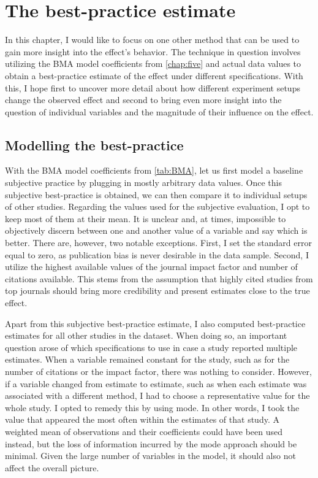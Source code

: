 \chapter{The best-practice estimate}
\label{chap:six}

In this chapter, I would like to focus on one other method that can be used to gain more insight into the effect's behavior. The technique in question involves utilizing the \ac{BMA} model coefficients from \autoref{chap:five} and actual data values to obtain a best-practice estimate of the effect under different specifications. With this, I hope first to uncover more detail about how different experiment setups change the observed effect and second to bring even more insight into the question of individual variables and the magnitude of their influence on the effect.


\section{Modelling the best-practice}
\label{sec:best_practice_base}

With the \ac{BMA} model coefficients from \autoref{tab:BMA}, let us first model a baseline subjective practice by plugging in mostly arbitrary data values. Once this subjective best-practice is obtained, we can then compare it to individual setups of other studies. Regarding the values used for the subjective evaluation, I opt to keep most of them at their mean. It is unclear and, at times, impossible to objectively discern between one and another value of a variable and say which is better. There are, however, two notable exceptions. First, I set the standard error equal to zero, as publication bias is never desirable in the data sample. Second, I utilize the highest available values of the journal impact factor and number of citations available. This stems from the assumption that highly cited studies from top journals should bring more credibility and present estimates close to the true effect. 

Apart from this subjective best-practice estimate, I also computed best-practice estimates for all other studies in the dataset. When doing so, an important question arose of which specifications to use in case a study reported multiple estimates. When a variable remained constant for the study, such as for the number of citations or the impact factor, there was nothing to consider. However, if a variable changed from estimate to estimate, such as when each estimate was associated with a different method, I had to choose a representative value for the whole study. I opted to remedy this by using mode. In other words, I took the value that appeared the most often within the estimates of that study. A weighted mean of observations and their coefficients could have been used instead, but the loss of information incurred by the mode approach should be minimal. Given the large number of variables in the model, it should also not affect the overall picture.

